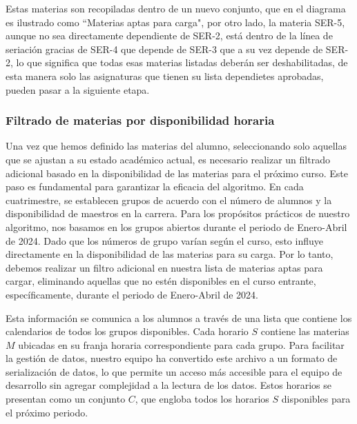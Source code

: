 Estas materias son recopiladas dentro de un nuevo conjunto, que en el diagrama es ilustrado como ``Materias aptas para carga", por otro lado, la materia SER-5, aunque no sea directamente dependiente de SER-2, está dentro de la línea de seriación gracias de SER-4 que depende de SER-3 que a su vez depende de SER-2, lo que significa que todas esas materias listadas deberán ser deshabilitadas, de esta manera solo las asignaturas que tienen su lista dependietes aprobadas, pueden pasar a la siguiente etapa.

\subsubsection{Filtrado de materias por disponibilidad horaria} \label{filtrado_de_materias_por_disponibilidad_horaria}

Una vez que hemos definido las materias del alumno, seleccionando solo aquellas que se ajustan a su estado académico actual, es necesario realizar un filtrado adicional basado en la disponibilidad de las materias para el próximo curso. Este paso es fundamental para garantizar la eficacia del algoritmo. En cada cuatrimestre, se establecen grupos de acuerdo con el número de alumnos y la disponibilidad de maestros en la carrera. Para los propósitos prácticos de nuestro algoritmo, nos basamos en los grupos abiertos durante el periodo de Enero-Abril de 2024. Dado que los números de grupo varían según el curso, esto influye directamente en la disponibilidad de las materias para su carga. Por lo tanto, debemos realizar un filtro adicional en nuestra lista de materias aptas para cargar, eliminando aquellas que no estén disponibles en el curso entrante, específicamente, durante el periodo de Enero-Abril de 2024.

Esta información se comunica a los alumnos a través de una lista que contiene los calendarios de todos los grupos disponibles. Cada horario \( S \) contiene las materias \( M \) ubicadas en su franja horaria correspondiente para cada grupo. Para facilitar la gestión de datos, nuestro equipo ha convertido este archivo a un formato de serialización de datos, lo que permite un acceso más accesible para el equipo de desarrollo sin agregar complejidad a la lectura de los datos. Estos horarios se presentan como un conjunto \( C \), que engloba todos los horarios \( S \) disponibles para el próximo periodo.


